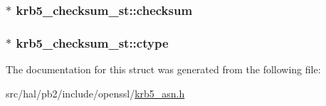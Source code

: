 \subsubsection[{\texorpdfstring{checksum}{checksum}}]{$\ast$ krb5\+\_\+checksum\+\_\+st\+::checksum}\hypertarget{structkrb5__checksum__st_aaecf3ca4c97259edba8bc729103d81ba}{}\label{structkrb5__checksum__st_aaecf3ca4c97259edba8bc729103d81ba}
\subsubsection[{\texorpdfstring{ctype}{ctype}}]{$\ast$ krb5\+\_\+checksum\+\_\+st\+::ctype}\hypertarget{structkrb5__checksum__st_ae066058605d0c59e10a98fbd71745705}{}\label{structkrb5__checksum__st_ae066058605d0c59e10a98fbd71745705}


The documentation for this struct was generated from the following file\+:\begin{DoxyCompactItemize}
\item 
src/hal/pb2/include/openssl/\hyperlink{krb5__asn_8h}{krb5\+\_\+asn.\+h}\end{DoxyCompactItemize}
